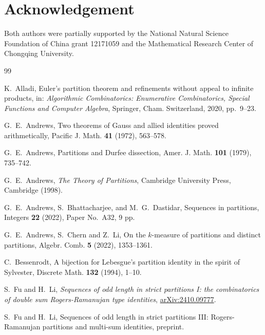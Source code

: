 \documentclass[11pt,reqno]{amsart}
\numberwithin{equation}{section}
\theoremstyle{plain}
\theoremstyle{definition}
\theoremstyle{named}
\begin{document}
\section*{Acknowledgement}
Both authors were partially supported by the National Natural Science Foundation of China grant 12171059 and the Mathematical Research Center of Chongqing University.



\begin{thebibliography}{99}

 K.~Alladi, Euler's partition theorem and refinements without appeal to infinite products, in: {\it Algorithmic Combinatorics: Enumerative Combinatorics, Special Functions and Computer Algebra}, Springer, Cham. Switzerland, 2020, pp.~9--23.





 G.~E.~Andrews, Two theorems of Gauss and allied identities proved arithmetically, Pacific J. Math. {\bf 41} (1972), 563--578.

 G.~E.~Andrews, Partitions and Durfee dissection, Amer. J. Math. {\bf 101} (1979), 735--742.

 G.~E.~Andrews, {\it The Theory of Partitions}, Cambridge University Press, Cambridge (1998).






G.~E.~Andrews, S.~Bhattacharjee, and M.~G.~Dastidar, Sequences in partitions, Integers \textbf{22} (2022), Paper No.~A32, 9 pp.

G.~E.~Andrews, S.~Chern and Z.~Li, On the $k$-measure of partitions and distinct partitions, Algebr. Comb. \textbf{5} (2022), 1353--1361.



 C.~Bessenrodt, A bijection for Lebesgue's partition identity in the spirit of Sylvester, Discrete Math. {\bf 132} (1994), 1--10.









 S.~Fu and H.~Li, {\it Sequences of odd length in strict partitions I: the combinatorics of double sum Rogers-Ramanujan type identities}, \href{https://arxiv.org/abs/2410.09777}{arXiv:2410.09777}.

 S.~Fu and H.~Li, Sequences of odd length in strict partitions III: Rogers-Ramanujan partitions and multi-sum identities, preprint.




\end{thebibliography}
\end{document}
